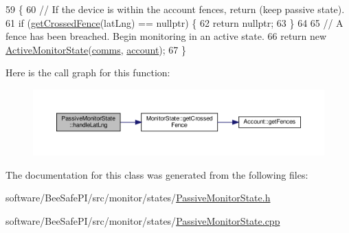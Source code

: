 \begin{DoxyCode}
59 \{
60     \textcolor{comment}{// If the device is within the account fences, return (keep passive state).}
61     \textcolor{keywordflow}{if} (\hyperlink{class_monitor_state_a332c5f42bf46cd217e36f300e5279766}{getCrossedFence}(latLng) == \textcolor{keyword}{nullptr}) \{
62         \textcolor{keywordflow}{return} \textcolor{keyword}{nullptr};
63     \}
64 
65     \textcolor{comment}{// A fence has been breached. Begin monitoring in an active state.}
66     \textcolor{keywordflow}{return} \textcolor{keyword}{new} \hyperlink{class_active_monitor_state}{ActiveMonitorState}(\hyperlink{class_monitor_state_a41914e9963c67ef2d17774f04bad3518}{comms}, \hyperlink{class_monitor_state_a41128d4942ec0d5b107c63d1d95af811}{account});
67 \}
\end{DoxyCode}
Here is the call graph for this function\+:
\nopagebreak
\begin{figure}[H]
\begin{center}
\leavevmode
\includegraphics[width=350pt]{dd/d30/class_passive_monitor_state_a173a7c8a4d0b8ecea5928e0c90dec26b_cgraph}
\end{center}
\end{figure}


The documentation for this class was generated from the following files\+:\begin{DoxyCompactItemize}
\item 
software/\+Bee\+Safe\+P\+I/src/monitor/states/\hyperlink{_passive_monitor_state_8h}{Passive\+Monitor\+State.\+h}\item 
software/\+Bee\+Safe\+P\+I/src/monitor/states/\hyperlink{_passive_monitor_state_8cpp}{Passive\+Monitor\+State.\+cpp}\end{DoxyCompactItemize}
